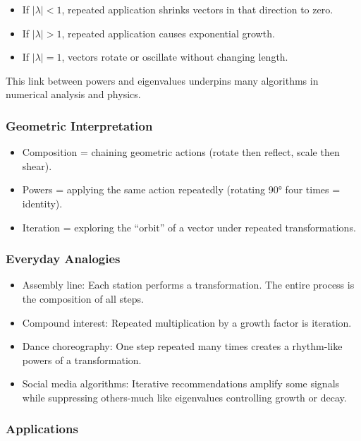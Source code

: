 \documentclass[
  letterpaper,
  DIV=11,
  numbers=noendperiod]{scrreprt}
\providecommand{\tightlist}{%
  \setlength{\itemsep}{0pt}\setlength{\parskip}{0pt}}
\begin{document}
\begin{itemize}
\tightlist
\item
  If \(|\lambda| < 1\), repeated application shrinks vectors in that
  direction to zero.
\item
  If \(|\lambda| > 1\), repeated application causes exponential growth.
\item
  If \(|\lambda| = 1\), vectors rotate or oscillate without changing
  length.
\end{itemize}

This link between powers and eigenvalues underpins many algorithms in
numerical analysis and physics.

\subsubsection{Geometric
Interpretation}\label{geometric-interpretation-9}

\begin{itemize}
\tightlist
\item
  Composition = chaining geometric actions (rotate then reflect, scale
  then shear).
\item
  Powers = applying the same action repeatedly (rotating 90° four times
  = identity).
\item
  Iteration = exploring the ``orbit'' of a vector under repeated
  transformations.
\end{itemize}

\subsubsection{Everyday Analogies}\label{everyday-analogies-41}

\begin{itemize}
\tightlist
\item
  Assembly line: Each station performs a transformation. The entire
  process is the composition of all steps.
\item
  Compound interest: Repeated multiplication by a growth factor is
  iteration.
\item
  Dance choreography: One step repeated many times creates a rhythm-like
  powers of a transformation.
\item
  Social media algorithms: Iterative recommendations amplify some
  signals while suppressing others-much like eigenvalues controlling
  growth or decay.
\end{itemize}

\subsubsection{Applications}\label{applications-8}
\end{document}

